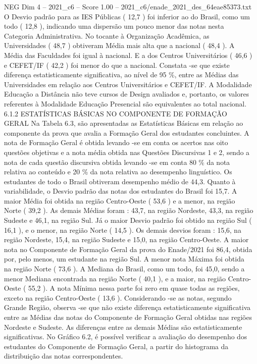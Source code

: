 \begin{textsample}{NEG Dim 4 – 2021\_c6 – Score 1.00 – 2021\_c6/enade\_2021\_des\_64eae85373.txt}
O Desvio padrão para as IES Públicas ( 12,7 ) foi inferior ao do Brasil, como um todo ( 12,8 ), indicando uma dispersão um pouco menor das notas nesta Categoria Administrativa.
No tocante à Organização Acadêmica, as Universidades ( 48,7 ) obtiveram Média mais alta que a nacional ( 48,4 ).
A Média das Faculdades foi igual à nacional.
E a dos Centros Universitários ( 46,6 ) e CEFET/IF ( 42,2 ) foi menor do que a nacional.
Constata -se que existe diferença estatisticamente significativa, ao nível de 95 \%, entre as Médias das Universidades em relação aos Centros Universitários e CEFET/IF.
A Modalidade Educação a Distância não teve cursos de Design avaliados e, portanto, os valores referentes à Modalidade Educação Presencial são equivalentes ao total nacional. 6.1.2 ESTATÍSTICAS BÁSICAS NO COMPONENTE DE FORMAÇÃO GERAL Na Tabela 6.3, são apresentadas as Estatísticas Básicas em relação ao componente da prova que avalia a Formação Geral dos estudantes concluintes.
A nota de Formação Geral é obtida levando -se em conta os acertos nas oito questões objetivas e a nota média obtida nas Questões Discursivas 1 e 2, sendo a nota de cada questão discursiva obtida levando -se em conta 80 \% da nota relativa ao conteúdo e 20 \% da nota relativa ao desempenho linguístico.
Os estudantes de todo o Brasil obtiveram desempenho médio de 44,3.
Quanto à variabilidade, o Desvio padrão das notas dos estudantes do Brasil foi 15,7.
A maior Média foi obtida na região Centro-Oeste ( 53,6 ) e a menor, na região Norte ( 39,2 ).
As demais Médias foram : 43,7, na região Nordeste, 43,3, na região Sudeste e 46,1, na região Sul.
Já o maior Desvio padrão foi obtido na região Sul ( 16,1 ), e o menor, na região Norte ( 14,5 ).
Os demais desvios foram : 15,6, na região Nordeste, 15,4, na região Sudeste e 15,0, na região Centro-Oeste.
A maior nota no Componente de Formação Geral da prova do Enade/2021 foi 86,4, obtida por, pelo menos, um estudante na região Sul.
A menor nota Máxima foi obtida na região Norte ( 73,6 ).
A Mediana do Brasil, como um todo, foi 45,0, sendo a menor Mediana encontrada na região Norte ( 40,1 ), e a maior, na região Centro-Oeste ( 55,2 ).
A nota Mínima nessa parte foi zero em quase todas as regiões, exceto na região Centro-Oeste ( 13,6 ).
Considerando -se as notas, segundo Grande Região, observa -se que não existe diferença estatisticamente significativa entre as Médias das notas do Componente de Formação Geral obtidas nas regiões Nordeste e Sudeste.
As diferenças entre as demais Médias são estatisticamente significativas.
No Gráfico 6.2, é possível verificar a avaliação do desempenho dos estudantes do Componente de Formação Geral, a partir do histograma da distribuição das notas correspondentes.

\end{textsample}
